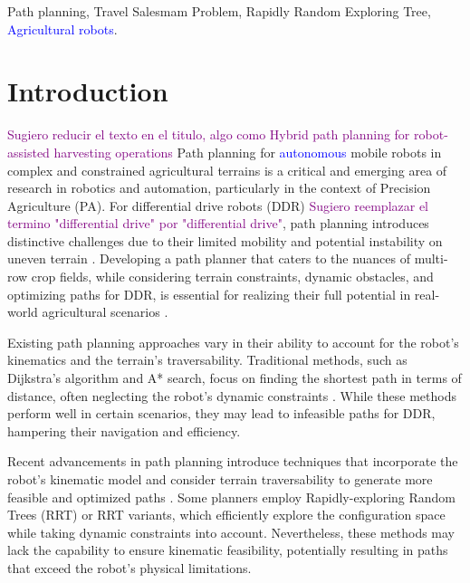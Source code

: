 \documentclass[conference]{IEEEtran}
\newcommand{\revL}[1]{\textcolor{blue}{#1}}
\newcommand{\revR}[1]{\textcolor{purple}{#1}}
\newcommand{\todoJ}[1]{\todo[inline,color=purple]{JAVI: #1}}
\begin{document}
\begin{IEEEkeywords}
Path planning, Travel Salesmam Problem, Rapidly Random Exploring Tree, \revL{Agricultural robots}.
\end{IEEEkeywords}

\section{Introduction}
\revR{Sugiero reducir el texto en el titulo, algo como Hybrid path planning for robot-assisted harvesting operations}
Path planning for \revL{autonomous} mobile robots in complex and constrained agricultural terrains is a critical and emerging area of research in robotics and automation, particularly in the context of Precision Agriculture (PA). 
For differential drive robots (DDR) \revR{Sugiero reemplazar el termino "differential drive" por "differential drive"}, path planning introduces distinctive challenges due to their limited mobility and potential instability on uneven terrain \cite{Auat2017}. Developing a path planner that caters to the nuances of multi-row crop fields, while considering terrain constraints, dynamic obstacles, and optimizing paths for DDR, is essential for realizing their full potential in real-world agricultural scenarios \cite{FAO2050}.

Existing path planning approaches vary in their ability to account for the robot's kinematics and the terrain's traversability. Traditional methods, such as Dijkstra's algorithm and A* search, focus on finding the shortest path in terms of distance, often neglecting the robot's dynamic constraints \cite{Pak2022}. While these methods perform well in certain scenarios, they may lead to infeasible paths for DDR, hampering their navigation and efficiency.

Recent advancements in path planning introduce techniques that incorporate the robot's kinematic model and consider terrain traversability to generate more feasible and optimized paths \cite{Xie2020}. Some planners \cite{Mashayekhi2020, Kontoudis2019,Zhang2019,Denggui } employ Rapidly-exploring Random Trees (RRT) or RRT variants, which efficiently explore the configuration space while taking dynamic constraints into account. Nevertheless, these methods may lack the capability to ensure kinematic feasibility, potentially resulting in paths that exceed the robot's physical limitations.
\end{document}

